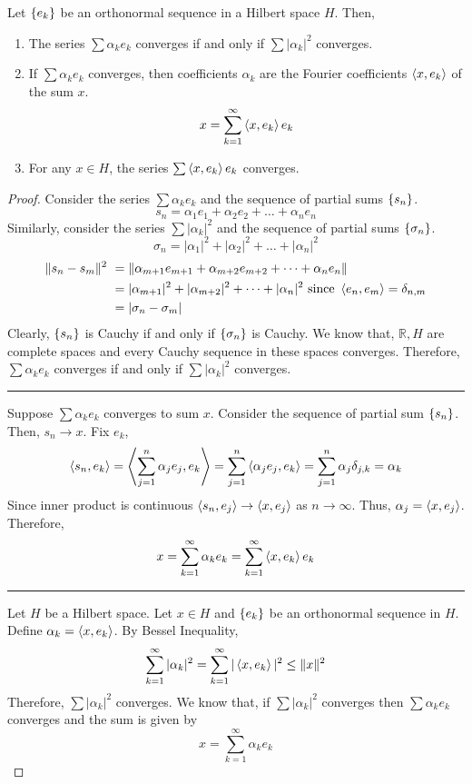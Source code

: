 \begin{theorem}[convergence]
Let $\left\{e_k\right\}$ be an orthonormal sequence in a Hilbert space $H$.
Then,
\begin{enumerate}
	\item The series $\sum \alpha_k e_k$ converges
	if and only if $\sum |\alpha_k|^2$ converges.
\item If $\sum \alpha_k e_k$ converges, then coefficients $\alpha_k$ are the Fourier coefficients $\left\langle x,e_k \right\rangle$ of the sum $x$.
	\[ x = \sum_{k=1}^\infty \left\langle x,e_k \right\rangle e_k \]
\item For any $x \in H$, the series $\sum \left\langle x,e_k \right\rangle e_k$ converges.
\end{enumerate}
\end{theorem}
\begin{proof}
	Consider the series $\sum \alpha_k e_k$ and the sequence of partial sums $\left\{s_n\right\}$.
	\[ s_n = \alpha_1 e_1 + \alpha_2 e_2 + \dots + \alpha_n e_n \]
	Similarly, consider the series $\sum |\alpha_k|^2$ and the sequence of partial sums $\left\{\sigma_n\right\}$.
	\[ \sigma_n = |\alpha_1|^2 + |\alpha_2|^2 + \dots + |\alpha_n|^2 \]
	\begin{align*}
		\|s_n - s_m\|^2 \
		& = \| \alpha_{m+1}e_{m+1} + \alpha_{m+2} e_{m+2} + \dots + \alpha_n e_n \| \\
		& = |\alpha_{m+1}|^2 + |\alpha_{m+2}|^2 + \dots + |\alpha_n|^2 \text{ since } \left\langle e_n,e_m \right\rangle = \delta_{n,m} \\
		& = |\sigma_n-\sigma_m|
	\end{align*}
	Clearly, $\left\{s_n\right\}$ is Cauchy if and only if $\left\{\sigma_n\right\}$ is Cauchy.
	We know that, $\mathbb{R},H$ are complete spaces and every Cauchy sequence in these spaces converges.
	Therefore, $\sum \alpha_k e_k$ converges if and only if $\sum |\alpha_k|^2$ converges.\\

	\hrule \vspace{1em}

	Suppose $\sum \alpha_k e_k$ converges to sum $x$.
	Consider the sequence of partial sum $\left\{s_n\right\}$.
	Then, $s_n \to x$.
	Fix $e_k$,
	\[ \left\langle s_n,e_k \right\rangle = \left\langle \sum_{j=1}^n \alpha_j e_j,e_k \right\rangle = \sum_{j=1}^n \left\langle \alpha_j e_j,e_k \right\rangle = \sum_{j=1}^n \alpha_j \delta_{j,k} = \alpha_k \]
	Since inner product is continuous $\left\langle s_n,e_j \right\rangle \to \left\langle x,e_j \right\rangle$ as $n \to \infty$.
	Thus, $\alpha_j = \left\langle x,e_j \right\rangle$.
	Therefore, 
	\[ x = \sum_{k=1}^\infty \alpha_k e_k = \sum_{k=1}^\infty \left\langle x,e_k \right\rangle e_k \]

	\hrule \vspace{1em}

	Let $H$ be a Hilbert space.
	Let $x \in H$ and $\left\{e_k\right\}$ be an orthonormal sequence in $H$.
	Define $\alpha_k = \left\langle x,e_k \right\rangle$.
	By Bessel Inequality,
	\[ \sum_{k=1}^\infty |\alpha_k|^2 = \sum_{k=1}^\infty |\left\langle x,e_k \right\rangle|^2 \le \|x\|^2 \]
	Therefore, $\sum |\alpha_k|^2$ converges.
	We know that, if $\sum |\alpha_k|^2$ converges then $\sum \alpha_k e_k$ converges and the sum is given by
	\[ x = \sum_{k=1}^\infty \alpha_k e_k \]
\end{proof}


